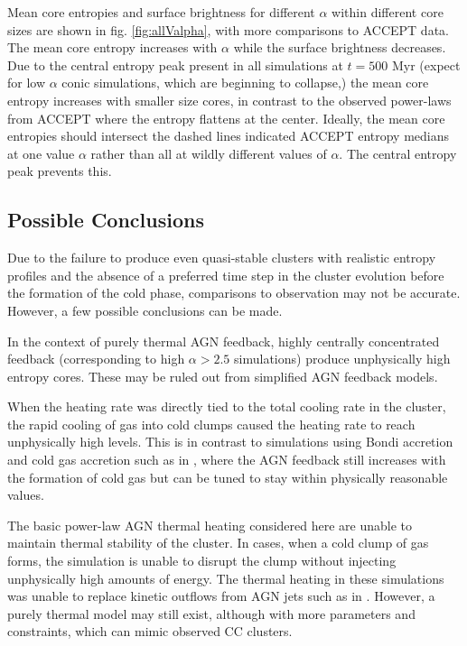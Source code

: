 \documentclass[iop,apjl, twocolappendix]{emulateapj}   %
\begin{document}
Mean core entropies and surface brightness for different $\alpha$ within
different core sizes are shown in fig. \ref{fig:allValpha}, with more
comparisons to ACCEPT data. The mean core entropy increases with $\alpha$ while
the surface brightness decreases.  Due to the central entropy peak present in
all simulations at $t= 500 \text{ Myr}$ (expect for low $\alpha$ conic
simulations, which are beginning to collapse,) the mean core entropy increases
with smaller size cores, in contrast to the observed power-laws from ACCEPT
where the entropy flattens at the center. Ideally, the mean core entropies
should intersect the dashed lines indicated ACCEPT entropy medians at one value
$\alpha$ rather than all at wildly different values of $\alpha$. The central
entropy peak prevents this. 

\subsection{ Possible Conclusions}
\label{sec:possible_conclusions}

Due to the failure to produce even quasi-stable clusters with realistic entropy
profiles and the absence of a preferred time step in the cluster evolution
before the formation of the cold phase, comparisons to observation may not be
accurate. However, a few possible conclusions can be made. 

In the context of purely thermal AGN feedback, highly centrally concentrated
feedback (corresponding to high $\alpha > 2.5$ simulations) produce
unphysically high entropy cores. These may be ruled out from simplified AGN
feedback models.

When the heating rate was directly tied to the total cooling rate in the
cluster, the rapid cooling of gas into cold clumps caused the heating rate to
reach unphysically high levels. This is in contrast to simulations using Bondi
accretion and cold gas accretion such as in \cite{meece_triggering_2017}, where
the AGN feedback still increases with the formation of cold gas but can be
tuned to stay within physically reasonable values.

The basic power-law AGN thermal heating considered here are unable to maintain
thermal stability of the cluster. In cases, when a cold clump of gas forms, the
simulation is unable to disrupt the clump without injecting unphysically high
amounts of energy. The thermal heating in these simulations was unable to
replace kinetic outflows from AGN jets such as in
\citep{meece_triggering_2017}. However, a purely thermal model may still exist,
although with more parameters and constraints, which can mimic observed CC
clusters.
\end{document}
